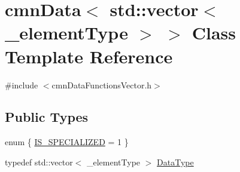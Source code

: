 \hypertarget{classcmn_data_3_01std_1_1vector_3_01__element_type_01_4_01_4}{\section{cmn\-Data$<$ std\-:\-:vector$<$ \-\_\-element\-Type $>$ $>$ Class Template Reference}
\label{classcmn_data_3_01std_1_1vector_3_01__element_type_01_4_01_4}
}


{\ttfamily \#include $<$cmn\-Data\-Functions\-Vector.\-h$>$}

\subsection*{Public Types}
\begin{DoxyCompactItemize}
\item 
enum \{ \hyperlink{classcmn_data_3_01std_1_1vector_3_01__element_type_01_4_01_4_ab0e90a24bd0f203a42883aad293d0152a612b4ed351eb8bd9c41c9a9da196fbe8}{I\-S\-\_\-\-S\-P\-E\-C\-I\-A\-L\-I\-Z\-E\-D} = 1
 \}
\item 
typedef std\-::vector$<$ \-\_\-element\-Type $>$ \hyperlink{classcmn_data_3_01std_1_1vector_3_01__element_type_01_4_01_4_a7a5332ebd12138b5f6d8b856cd3fdfd5}{Data\-Type}
\end{DoxyCompactItemize}
